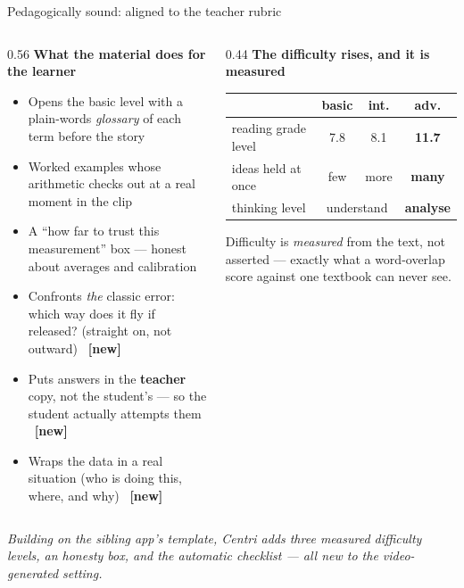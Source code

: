 \documentclass[aspectratio=169,10pt]{beamer}
\newcommand{\ok}{{\color{cApp}\textbf{\checkmark}}}
\newcommand{\nw}{{\scriptsize\color{cAccent}\textbf{[new]}}}
\newcommand{\takeaway}[1]{\vfill{\footnotesize\itshape\color{cGrey}#1\par}}
\begin{document}
\begin{frame}{Pedagogically sound: aligned to the teacher rubric}
\scriptsize
\begin{columns}[T]
\begin{column}{0.56\textwidth}
\textbf{\color{cApp}What the material does for the learner}
\begin{itemize}\setlength\itemsep{1.2pt}
  \item Opens the basic level with a plain-words \emph{glossary} of each term before the story \ok
  \item Worked examples whose arithmetic checks out at a real moment in the clip \ok
  \item A ``how far to trust this measurement'' box --- honest about averages and calibration \ok
  \item Confronts \emph{the} classic error: which way does it fly if released? (straight on, not
        outward) \ok\ \nw
  \item Puts answers in the \textbf{teacher} copy, not the student's --- so the student actually
        attempts them \ok\ \nw
  \item Wraps the data in a real situation (who is doing this, where, and why) \ok\ \nw
\end{itemize}
\end{column}
\begin{column}{0.44\textwidth}
\textbf{\color{cMeas}The difficulty rises, and it is measured}
\vspace{3pt}
\renewcommand{\arraystretch}{1.3}
\begin{center}
\begin{tabular}{@{}lccc@{}}
\toprule
& \color{cBasic}basic & \color{cInter}int. & \color{cAdv}adv. \\
\midrule
reading grade level & 7.8 & 8.1 & \textbf{11.7} \\
ideas held at once & few & more & \textbf{many} \\
thinking level & \multicolumn{2}{c}{understand} & \textbf{analyse} \\
\bottomrule
\end{tabular}
\end{center}
\vspace{4pt}
{\scriptsize Difficulty is \emph{measured} from the text, not asserted --- exactly what a
word-overlap score against one textbook can never see.}
\end{column}
\end{columns}
\takeaway{Building on the sibling app's template, Centri adds three measured difficulty levels, an
honesty box, and the automatic checklist --- all new to the video-generated setting.}
\end{frame}
\end{document}
